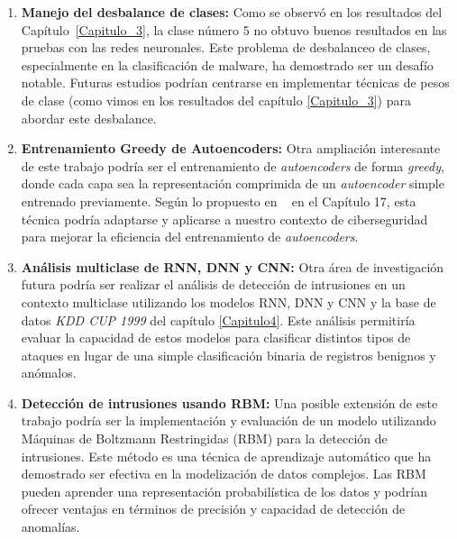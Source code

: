 \begin{enumerate}    
    \item \textbf{Manejo del desbalance de clases:} Como se observó en los resultados del Capítulo~\ref{Capitulo_3}, la clase número 5 no obtuvo buenos resultados en las pruebas con las redes neuronales. Este problema de desbalanceo de clases, especialmente en la clasificación de malware, ha demostrado ser un desafío notable. Futuras estudios podrían centrarse en implementar técnicas de pesos de clase (como vimos en los resultados del capítulo \ref{Capitulo_3}) para abordar este desbalance.

    \item \textbf{Entrenamiento Greedy de Autoencoders:} Otra ampliación interesante de este trabajo podría ser el entrenamiento de \textit{autoencoders} de forma \textit{greedy}, donde cada capa sea la representación comprimida de un \textit{autoencoder} simple entrenado previamente. Según lo propuesto en ~\cite{geron2022hands} en el Capítulo 17, esta técnica podría adaptarse y aplicarse a nuestro contexto de ciberseguridad para mejorar la eficiencia del entrenamiento de \textit{autoencoders}.

    \item \textbf{Análisis multiclase de RNN, DNN y CNN:} Otra área de investigación futura podría ser realizar el análisis de detección de intrusiones en un contexto multiclase utilizando los modelos RNN, DNN y CNN y la base de datos \textit{KDD CUP 1999} del capítulo \ref{Capitulo4}. Este análisis permitiría evaluar la capacidad de estos modelos para clasificar distintos tipos de ataques en lugar de una simple clasificación binaria de registros benignos y anómalos.
    
    \item \textbf{Detección de intrusiones usando RBM:} Una posible extensión de este trabajo podría ser la implementación y evaluación de un modelo utilizando Máquinas de Boltzmann Restringidas (RBM) \citep{alrawashdeh2016toward} para la detección de intrusiones. Este método es una técnica de aprendizaje automático que ha demostrado ser efectiva en la modelización de datos complejos. Las RBM pueden aprender una representación probabilística de los datos y podrían ofrecer ventajas en términos de precisión y capacidad de detección de anomalías.

\end{enumerate}







